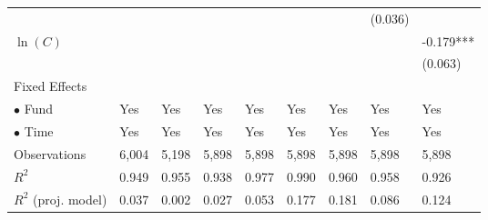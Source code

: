 \documentclass[openany]{book}
\theoremstyle{definition}
\theoremstyle{definition}
\theoremstyle{definition}
\theoremstyle{remark}
\begin{document}
\begin{table}[ht]
\begin{tabularx}{0.975\textwidth}{lYYYYYYYY}
   &  &  &  &  &  &  & (0.036) &  \\ 
  $\ln(C)$ &  &  &  &  &  &  &  & -0.179*** \\ 
   &  &  &  &  &  &  &  & (0.063) \\ 
  Fixed Effects &  &  &  &  &  &  &  &  \\ 
  $\bullet$ Fund & Yes & Yes & Yes & Yes & Yes & Yes & Yes & Yes \\ 
  $\bullet$ Time & Yes & Yes & Yes & Yes & Yes & Yes & Yes & Yes \\ 
  Observations & 6,004 & 5,198 & 5,898 & 5,898 & 5,898 & 5,898 & 5,898 & 5,898 \\ 
  $R^2$ & 0.949 & 0.955 & 0.938 & 0.977 & 0.990 & 0.960 & 0.958 & 0.926 \\ 
  $R^2$ (proj. model) & 0.037 & 0.002 & 0.027 & 0.053 & 0.177 & 0.181 & 0.086 & 0.124 \\ 
   \bottomrule
\end{tabularx}
\endgroup
\end{table}
\end{document}
